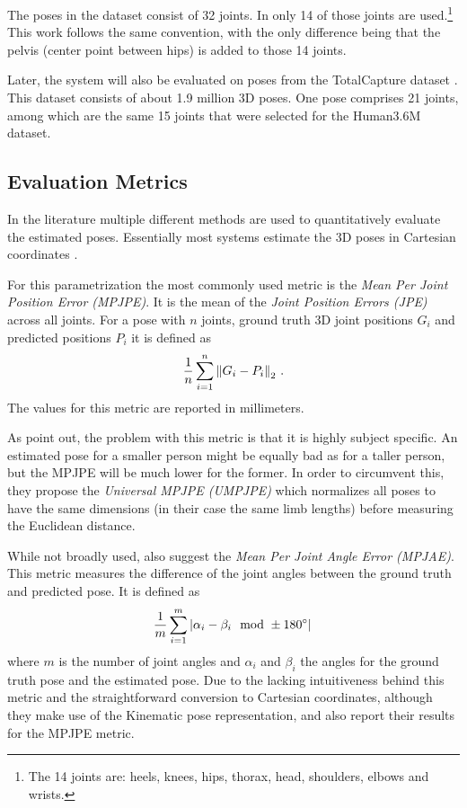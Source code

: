 The poses in the dataset consist of 32 joints.
In \cite{drover18} only 14 of those joints are used.\footnote{
The 14 joints are: heels, knees, hips, thorax, head, shoulders, elbows and wrists.
}
This work follows the same convention, with the only difference being that the pelvis (center point between hips) is added to those 14 joints.

Later, the system will also be evaluated on poses from the TotalCapture dataset \cite{trumble17}.
This dataset consists of about 1.9 million 3D poses.
One pose comprises 21 joints, among which are the same 15 joints that were selected for the Human3.6M dataset.

\subsection{Evaluation Metrics}
In the literature multiple different methods are used to quantitatively evaluate the estimated poses. 
Essentially most systems estimate the 3D poses in Cartesian coordinates \cite{drover18, chen17, bogo16, grinciunaite16, yasin16, wandt19, tome17, tekin16, tekin17, pavlakos17}.

For this parametrization the most commonly used metric is the \emph{Mean Per Joint Position Error (MPJPE)}.
It is the mean of the \emph{Joint Position Errors (JPE)} across all joints.
For a pose with $n$ joints, ground truth 3D joint positions $G_i$ and predicted positions $P_i$ it is defined as
\begin{equation}
\frac{1}{n} \sum_{i = 1}^{n}  \norm{G_i - P_i}_2 \ .
\end{equation}
The values for this metric are reported in millimeters.

As \citet{ionescu14} point out, the problem with this metric is that it is highly subject specific.
An estimated pose for a smaller person might be equally bad as for a taller person, but the MPJPE will be much lower for the former.
In order to circumvent this, they propose the \emph{Universal MPJPE (UMPJPE)} which normalizes all poses to have the same dimensions (in their case the same limb lengths) before measuring the Euclidean distance.

While not broadly used, \citet{ionescu14} also suggest the \emph{Mean Per Joint Angle Error (MPJAE)}.
This metric measures the difference of the joint angles between the ground truth and predicted pose.
It is defined as
\begin{equation}
\frac{1}{m} \sum_{i = 1}^{m} \abs{\alpha_i - \beta_i \mod \pm 180\degree} \,
\end{equation}
where $m$ is the number of joint angles and $\alpha_i$ and $\beta_i$ the angles for the ground truth pose and the estimated pose.
Due to the lacking intuitiveness behind this metric and the straightforward conversion to Cartesian coordinates, although they make use of the Kinematic pose representation, \citet{jahangiri17} and \citet{zhou16_2} also report their results for the MPJPE metric.

